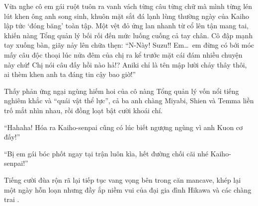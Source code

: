 \documentclass[../main.tex]{subfiles}
\begin{document}
Vừa nghe cô em gái ruột tuôn ra vanh vách từng câu từng chữ mà mình từng lén lút khen ông anh song sinh, khuôn mặt sắt đá lạnh lùng thường ngày của Kaiho lập tức `đóng băng' toàn tập. Một vệt đỏ ửng lan nhanh từ cổ lên tận mang tai, khiến nàng Tổng quản lý bối rối đến mức luống cuống cả tay chân. Cô đập mạnh tay xuống bàn, giãy nảy lên chữa thẹn: ``N-Này! Suzu!! Em\dots\ em đừng có bới móc mấy câu độc thoại lúc nửa đêm của chị ra kể trước mặt cái đám nhiều chuyện này chứ! Chị nói câu đấy hồi nào hả!? Aniki chỉ là tên mập lười chảy thây thôi, ai thèm khen anh ta đáng tin cậy bao giờ!''

Thấy phản ứng ngại ngùng hiếm hoi của cô nàng Tổng quản lý vốn nổi tiếng nghiêm khắc và ``quái vật thể lực'', cả ba anh chàng Miyabi, Shien và Temma liền trố mắt nhìn nhau, rồi đồng loạt bật cười khoái chí.

``Hahaha! Hóa ra Kaiho-senpai cũng có lúc biết ngượng ngùng vì anh Kuon cơ đấy!''

``Bị em gái bóc phốt ngay tại trận luôn kìa, hết đường chối cãi nhé Kaiho-senpai!''

Tiếng cười đùa rộn rã lại tiếp tục vang vọng bên trong căn mancave, khép lại một ngày hỗn loạn nhưng đầy ắp niềm vui của đại gia đình Hikawa và các chàng trai \hls.
\end{document}
